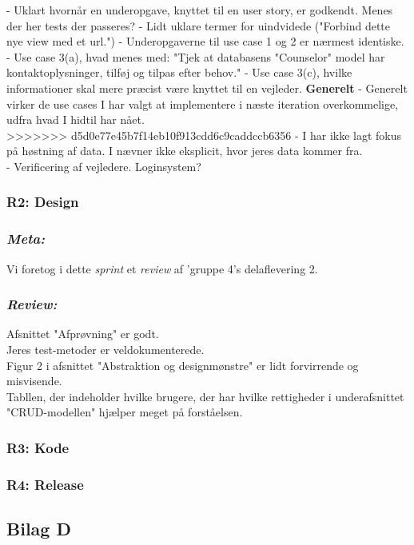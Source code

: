 \documentclass[12pt]{article}
\begin{document}
- Uklart hvornår en underopgave, knyttet til en user story, er godkendt. Menes der her tests der passeres?
- Lidt uklare termer for uindvidede ("Forbind dette nye view med et url.")
- Underopgaverne til use case 1 og 2 er nærmest identiske.
- Use case 3(a), hvad menes med: "Tjek at databasens "Counselor" model har kontaktoplysninger, tilføj og tilpas efter behov."
- Use case 3(c), hvilke informationer skal mere præcist være knyttet til en vejleder.
\textbf{Generelt}
- Generelt virker de use cases I har valgt at implementere i næste iteration overkommelige, udfra hvad I hidtil har nået. \\
>>>>>>> d5d0e77e45b7f14eb10f913cdd6c9caddccb6356
- I har ikke lagt fokus på høstning af data. I nævner ikke eksplicit, hvor jeres data kommer fra. \\
- Verificering af vejledere. Loginsystem?

\subsubsection{R2: Design}
\subsubsection*{\textit{Meta:}}
Vi foretog i dette \textit{sprint} et \textit{review} af 'gruppe 4's delaflevering 2.

\subsubsection*{\textit{Review:}}
Afsnittet "Afprøvning" er godt. \\
Jeres test-metoder er veldokumenterede. \\
Figur 2 i afsnittet "Abstraktion og designmønstre" er lidt forvirrende og misvisende. \\
Tabllen, der indeholder hvilke brugere, der har hvilke rettigheder i underafsnittet "CRUD-modellen" hjælper meget på forståelsen.

\subsubsection{R3: Kode}
\subsubsection{R4: Release}

\newpage
\subsection{Bilag D}
\label{sec:bilag_tests}
\end{document}

